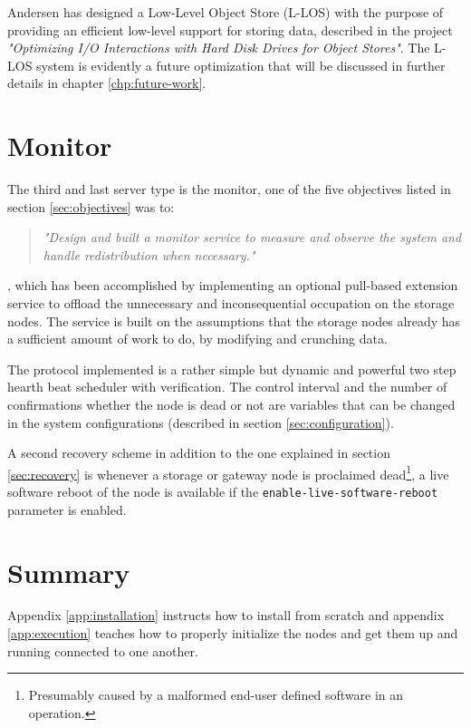 Andersen has designed a Low-Level Object Store (L-LOS) with the purpose of providing an efficient low-level support for storing data, described in the project \textit{"Optimizing I/O Interactions with Hard Disk Drives for Object Stores"}\cite{andersen2016}. The L-LOS system is evidently a future optimization that will be discussed in further details in chapter \ref{chp:future-work}. 

\section{Monitor} \label{sec:monitor}
The third and last server type is the monitor, one of the five objectives listed in section \ref{sec:objectives} was to:

\begin{quotation}
	\textit{"Design and built a monitor service to measure and observe the system and handle redistribution when necessary."}
\end{quotation}

, which has been accomplished by implementing an optional pull-based extension service to offload the unnecessary and inconsequential 	occupation on the storage nodes. The service is built on the assumptions that the storage nodes already has a sufficient amount of work to do, by modifying and crunching data.
\newline

The protocol implemented is a rather simple but dynamic and powerful two step hearth beat scheduler with verification. The control interval and the number of confirmations whether the node is dead or not are variables that can be changed in the system configurations (described in section \ref{sec:configuration}). 

A second recovery scheme in addition to the one explained in section \ref{sec:recovery} is whenever a storage or gateway node is proclaimed dead\footnote{Presumably caused by a malformed end-user defined software in an operation.}, a live software reboot of the node is available if the \texttt{enable-live-software-reboot} parameter is enabled.

\section{Summary}
Appendix \ref{app:installation} instructs how to install \CodeName from scratch and appendix \ref{app:execution} teaches how to properly initialize the nodes and get them up and running connected to one another.
